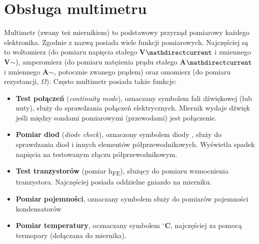 % 
% 
% 
% 

\section{Obsługa multimetru}

Multimetr (zwany też miernikiem) to podstawowy przyrząd pomiarowy każdego elektronika. Zgodnie z nazwą posiada wiele funkcji pomiarowych.
Najczęściej są to woltomierz (do pomiaru napięcia stałego \textbf{V$\mathdirectcurrent$} i zmiennego \textbf{V$\sim$}),
amperomierz (do pomiaru natężenia prądu stałego \textbf{A$\mathdirectcurrent$} i zmiennego \textbf{A$\sim$}, potocznie zwanego prądem)
oraz omomierz (do pomiaru rezystancji, \textbf{$\Omega$}). Często multimetr posiada także funkcje:
\begin{itemize}
\item \textbf{Test połączeń} (\textit{continuity mode}), oznaczany symbolem fali dźwiękowej (lub nuty), służy do sprawdzania połączeń elektrycznych.
  Miernik wydaje dźwięk jeśli między sondami pomiarowymi (przewodami) jest połączenie.
\item \textbf{Pomiar diod} (\textit{diode check}), oznaczony symbolem diody , służy do sprawdzania diod i innych elementów półprzewodnikowych.
  Wyświetla spadek napięcia na testowanym złączu półprzewodnikowym.
\item \textbf{Test tranzystorów} (pomiar h\textsubscript{FE}), służący do pomiaru wzmocnienia tranzystora. Najczęściej posiada oddzielne gniazdo
  na mierniku.
\item \textbf{Pomiar pojemności}, oznaczany symbolem  służy do pomiarów pojemności kondensatorów
\item \textbf{Pomiar temperatury}, ocznaczany symbolem \textbf{$^{\circ}$C}, najczęściej za pomocą termopary (dołączana do miernika).
\end{itemize}

